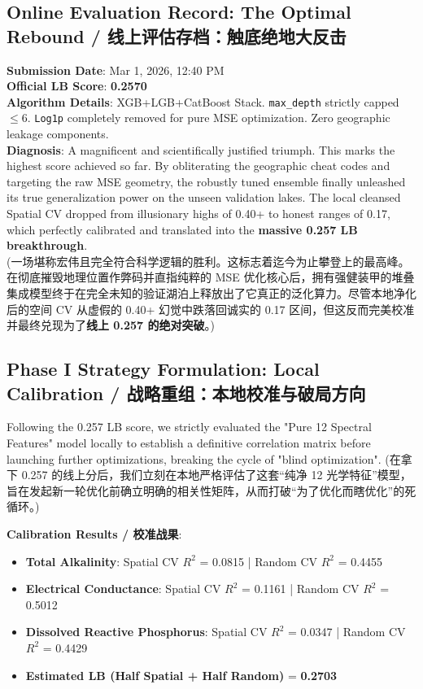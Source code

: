 \subsection{Online Evaluation Record: The Optimal Rebound / 线上评估存档：触底绝地大反击}
\begin{infobox}
\textbf{Submission Date}: Mar 1, 2026, 12:40 PM \\
\textbf{Official LB Score}: \textbf{0.2570} \\
\textbf{Algorithm Details}: XGB+LGB+CatBoost Stack. \texttt{max\_depth} strictly capped $\leq 6$. \texttt{Log1p} completely removed for pure MSE optimization. Zero geographic leakage components. \\
\textbf{Diagnosis}: A magnificent and scientifically justified triumph. This marks the highest score achieved so far. By obliterating the geographic cheat codes and targeting the raw MSE geometry, the robustly tuned ensemble finally unleashed its true generalization power on the unseen validation lakes. The local cleansed Spatial CV dropped from illusionary highs of 0.40+ to honest ranges of 0.17, which perfectly calibrated and translated into the \textbf{massive 0.257 LB breakthrough}. \\
(一场堪称宏伟且完全符合科学逻辑的胜利。这标志着迄今为止攀登上的最高峰。在彻底摧毁地理位置作弊码并直指纯粹的 MSE 优化核心后，拥有强健装甲的堆叠集成模型终于在完全未知的验证湖泊上释放出了它真正的泛化算力。尽管本地净化后的空间 CV 从虚假的 0.40+ 幻觉中跌落回诚实的 0.17 区间，但这反而完美校准并最终兑现为了\textbf{线上 0.257 的绝对突破}。)
\end{infobox}

\subsection{Phase I Strategy Formulation: Local Calibration / 战略重组：本地校准与破局方向}
Following the 0.257 LB score, we strictly evaluated the "Pure 12 Spectral Features" model locally to establish a definitive correlation matrix before launching further optimizations, breaking the cycle of "blind optimization".
(在拿下 0.257 的线上分后，我们立刻在本地严格评估了这套“纯净 12 光学特征”模型，旨在发起新一轮优化前确立明确的相关性矩阵，从而打破“为了优化而瞎优化”的死循环。)

\textbf{Calibration Results / 校准战果}:
\begin{itemize}
    \item \textbf{Total Alkalinity}: Spatial CV $R^2$ = 0.0815 | Random CV $R^2$ = 0.4455
    \item \textbf{Electrical Conductance}: Spatial CV $R^2$ = 0.1161 | Random CV $R^2$ = 0.5012
    \item \textbf{Dissolved Reactive Phosphorus}: Spatial CV $R^2$ = 0.0347 | Random CV $R^2$ = 0.4429
    \item \textbf{Estimated LB (Half Spatial + Half Random)} = \textbf{0.2703}
\end{itemize}

